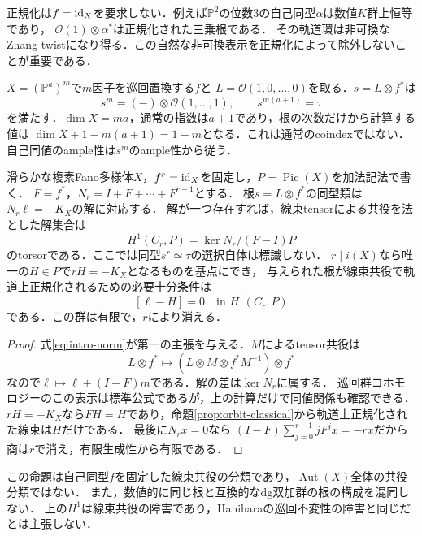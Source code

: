 \documentclass[11pt,a4paper]{ltjsarticle}
\begin{document}
\begin{remark}[残すべき自己同型]
正規化は$f=\operatorname{id}_X$を要求しない．例えば$\mathbb P^2$の位数3の自己同型$\alpha$は数値$K$群上恒等であり，
$\mathcal O(1)\otimes\alpha^*$は正規化された三乗根である．
その軌道環は非可換なZhang twistになり得る．この自然な非可換表示を正規化によって除外しないことが重要である．
\end{remark}

\begin{example}[naiveなcoindexのずれは任意に大きくなる]\label{ex:product}
$X=(\mathbb P^a)^m$で$m$因子を巡回置換する$f$と
$L=\mathcal O(1,0,\ldots,0)$を取る．$s=L\otimes f^*$は
\[
 s^m=(-)\otimes\mathcal O(1,\ldots,1),\qquad
 s^{m(a+1)}=\tau
\]
を満たす．$\dim X=ma$，通常の指数は$a+1$であり，根の次数だけから計算する値は
$\dim X+1-m(a+1)=1-m$となる．これは通常のcoindexではない．
自己同値のample性は$s^m$のample性から従う．
\end{example}

\begin{proposition}[標識変更と巡回群コホモロジー]\label{prop:root-cohomology}
滑らかな複素Fano多様体$X$，$f^r=\operatorname{id}_X$を固定し，$P=\operatorname{Pic}(X)$を加法記法で書く．
$F=f^*$，$N_r=I+F+\cdots+F^{r-1}$とする．
根$s=L\otimes f^*$の同型類は$N_r\ell=-K_X$の解に対応する．
解が一つ存在すれば，線束tensorによる共役を法とした解集合は
\[
 H^1(C_r,P)=\ker N_r/(F-I)P
\]
のtorsorである．ここでは同型$s^r\simeq\tau$の選択自体は標識しない．
$r\mid i(X)$なら唯一の$H\in P$で$rH=-K_X$となるものを基点にでき，
与えられた根が線束共役で軌道上正規化されるための必要十分条件は
\[
 [\ell-H]=0\quad\text{in }H^1(C_r,P)
\]
である．この群は有限で，$r$により消える．
\end{proposition}
\begin{proof}
式\eqref{eq:intro-norm}が第一の主張を与える．$M$によるtensor共役は
\[
 L\otimes f^*\longmapsto (L\otimes M\otimes f^*M^{-1})\otimes f^*
\]
なので$\ell\mapsto\ell+(I-F)m$である．解の差は$\ker N_r$に属する．
巡回群コホモロジーのこの表示は標準公式\cite[II, Example 1.20]{Milne}であるが，上の計算だけで同値関係も確認できる．
$rH=-K_X$なら$FH=H$であり，命題\ref{prop:orbit-classical}から軌道上正規化された線束は$H$だけである．
最後に$N_rx=0$なら
$(I-F)\sum_{j=0}^{r-1}jF^jx=-rx$だから商は$r$で消え，有限生成性から有限である．
\end{proof}

\begin{remark}
この命題は自己同型$f$を固定した線束共役の分類であり，$\operatorname{Aut}(X)$全体の共役分類ではない．
また，数値的に同じ根と互換的なdg双加群の根の構成を混同しない．
上の$H^1$は線束共役の障害であり，Haniharaの巡回不変性の障害と同じだとは主張しない．
\end{remark}
\end{document}
